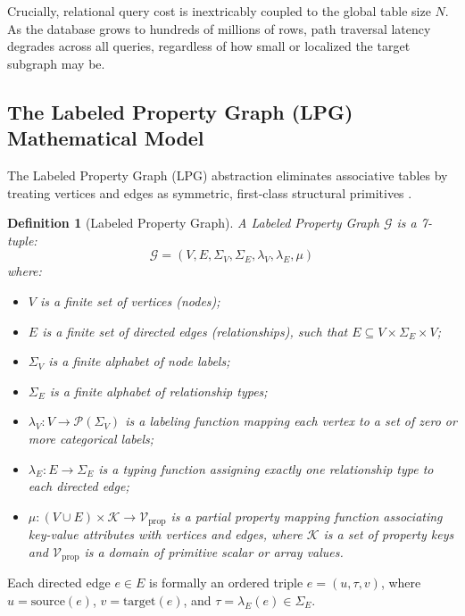 \documentclass[10pt,twocolumn,letterpaper]{article}
\newtheorem{definition}[theorem]{Definition}
\begin{document}
Crucially, relational query cost is inextricably coupled to the global table size $N$. As the database grows to hundreds of millions of rows, path traversal latency degrades across all queries, regardless of how small or localized the target subgraph may be.

\subsection{The Labeled Property Graph (LPG) Mathematical Model}
The Labeled Property Graph (LPG) abstraction eliminates associative tables by treating vertices and edges as symmetric, first-class structural primitives \cite{robinson2015graph}.

\begin{definition}[Labeled Property Graph]
A Labeled Property Graph $\mathcal{G}$ is a 7-tuple:
\begin{equation}
\mathcal{G} = (V, E, \Sigma_V, \Sigma_E, \lambda_V, \lambda_E, \mu)
\end{equation}
where:
\begin{itemize}
    \item $V$ is a finite set of vertices (nodes);
    \item $E$ is a finite set of directed edges (relationships), such that $E \subseteq V \times \Sigma_E \times V$;
    \item $\Sigma_V$ is a finite alphabet of node labels;
    \item $\Sigma_E$ is a finite alphabet of relationship types;
    \item $\lambda_V: V \to \mathcal{P}(\Sigma_V)$ is a labeling function mapping each vertex to a set of zero or more categorical labels;
    \item $\lambda_E: E \to \Sigma_E$ is a typing function assigning exactly one relationship type to each directed edge;
    \item $\mu: (V \cup E) \times \mathcal{K} \to \mathcal{V}_{\text{prop}}$ is a partial property mapping function associating key-value attributes with vertices and edges, where $\mathcal{K}$ is a set of property keys and $\mathcal{V}_{\text{prop}}$ is a domain of primitive scalar or array values.
\end{itemize}
\end{definition}

Each directed edge $e \in E$ is formally an ordered triple $e = (u, \tau, v)$, where $u = \text{source}(e)$, $v = \text{target}(e)$, and $\tau = \lambda_E(e) \in \Sigma_E$.
\end{document}
